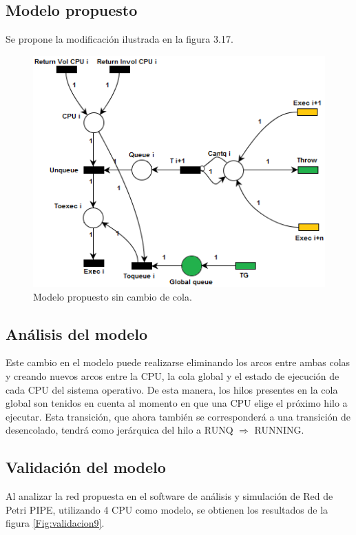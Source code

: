 \documentclass[a4paper]{book}
\begin{document}
\subsection{Modelo propuesto}
Se propone la modificaci\'on ilustrada en la figura 3.17.

\begin{figure} [H]
	\begin{center}
	    \includegraphics[scale=1]{./imagenes/it9modelored.png}
		\caption{Modelo propuesto sin cambio de cola.}
	\end{center}
\end{figure}

\subsection{An\'alisis del modelo}
Este cambio en el modelo puede realizarse eliminando los arcos entre ambas colas y creando nuevos arcos entre la CPU, la cola global y el estado de ejecuci\'on de cada CPU del sistema operativo. De esta manera, los hilos presentes en la cola global son tenidos en cuenta al momento en que una CPU elige el pr\'oximo hilo a ejecutar. Esta transici\'on, que ahora tambi\'en se corresponder\'a a una transici\'on de desencolado,  tendr\'a como jer\'arquica del hilo a RUNQ $\Rightarrow$ RUNNING.

\subsection{Validaci\'on del modelo}
Al analizar la red propuesta en el software de an\'alisis y simulaci\'on de Red de Petri PIPE, utilizando 4 CPU como modelo, se obtienen los resultados de la figura \ref{Fig:validacion9}.
\end{document}
